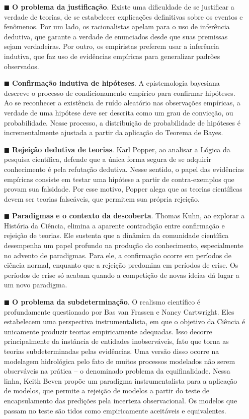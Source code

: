 \documentclass[./main.tex]{subfiles}
\begin{document}
\begin{itemize}
    \item[$\blacksquare$] \textbf{O problema da justificação}. Existe uma dificuldade de se justificar a verdade de teorias, de se estabelecer explicações definitivas sobre os eventos e fenômenos. Por um lado, os racionalistas apelam para o uso de inferência dedutiva, que garante a verdade de enunciados desde que suas premissas sejam verdadeiras. Por outro, os empiristas preferem usar a inferência indutiva, que faz uso de evidências empíricas para generalizar padrões observados.
    \item  [$\blacksquare$] \textbf{Confirmação indutiva de hipóteses}. A epistemologia bayesiana descreve o processo de condicionamento empírico para confirmar hipóteses. Ao se reconhecer a existência de ruído aleatório nas observações empíricas, a verdade de uma hipótese deve ser descrita como um grau de convicção, ou probabilidade. Nesse processo, a distribuição de probabilidade de hipóteses é incrementalmente ajustada a partir da aplicação do Teorema de Bayes. 
    \item[$\blacksquare$] \textbf{Rejeição dedutiva de teorias}. Karl Popper, ao analisar a Lógica da pesquisa científica, defende que a única forma segura de se adquirir conhecimento é pela refutação dedutiva. Nesse sentido, o papel das evidências empíricas consiste em testar uma hipótese a partir de contra-exemplos que provam sua falsidade. Por esse motivo, Popper alega que as teorias científicas devem ser teorias falseáveis, que permitem sua própria rejeição.  
    \item     [$\blacksquare$] \textbf{Paradigmas e o contexto da descoberta}. Thomas Kuhn, ao explorar a História da Ciência, elimina a aparente contradição entre confirmação e rejeição de teorias. Ele sustenta que a dinâmica da comunidade científica desempenha um papel profundo na produção do conhecimento, especialmente no advento de paradigmas. Para ele, a confirmação ocorre em períodos de ciência normal, enquanto que a rejeição predomina em períodos de crise. Os períodos de crise só acabam quando a competição de novas ideias dá lugar a um novo \gls{paradigma}.
    \item[$\blacksquare$] \textbf{O problema da subdeterminação}. O realismo científico é profundamente questionado por Bas van Frassen e Nancy Cartwright. Eles estabelecem uma perspectiva instrumentalista, em que o objetivo da Ciência é unicamente produzir teorias empiricamente adequadas. Isso decorre principalmente da instância de entidades inobserváveis, fato que torna as teorias subdeterminadas pelas evidências. Uma versão disso ocorre na modelagem hidrológica pelo fato de muitos processos modelados não serem observáveis na prática -- o denominado problema da equifinalidade. Nessa linha, Keith Beven propõe um \gls{paradigma} instrumentalista para a aplicação de modelos, que permite a rejeição de modelos a partir do teste de encapsulamento das predições pela incerteza observacional. Os modelos que passam no teste são tidos como empiricamente aceitáveis e equivalentes.  
\end{itemize}
\end{document}
